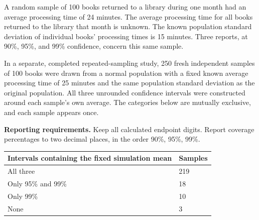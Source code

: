 \clearpage
{}
A random sample of 100 books returned to a library during one month had an average processing time of 24 minutes. The average processing time for all books returned to the library that month is unknown. The known population standard deviation of individual books' processing times is 15 minutes. Three reports, at 90\%, 95\%, and 99\% confidence, concern this same sample.

In a separate, completed repeated-sampling study, 250 fresh independent samples of 100 books were drawn from a normal population with a fixed known average processing time of 25 minutes and the same population standard deviation as the original population. All three unrounded confidence intervals were constructed around each sample's own average. The categories below are mutually exclusive, and each sample appears once.

\textbf{Reporting requirements.} Keep all calculated endpoint digits. Report coverage percentages to two decimal places, in the order 90\%, 95\%, 99\%.

\begin{center}\begin{tabular}{@{}ll@{}}\toprule
Intervals containing the fixed simulation mean & Samples\\\midrule
All three & 219\\
Only 95\% and 99\% & 18\\
Only 99\% & 10\\
None & 3\\
\bottomrule\end{tabular}\end{center}


\BlankInformationTable
\clearpage
{}

